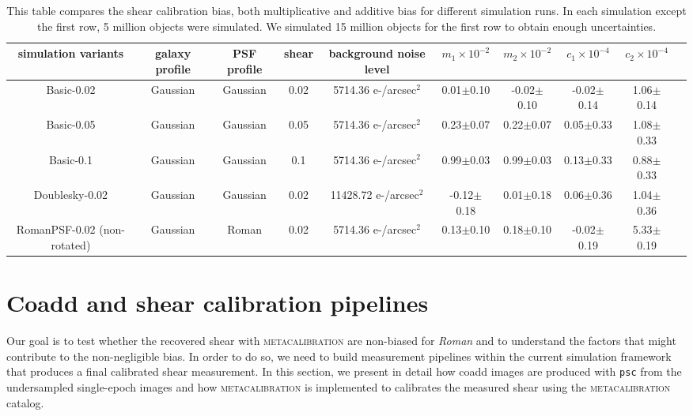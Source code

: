 \documentclass[fleqn,usenatbib]{mnras}
\begin{document}
\begin{table}
	\centering
	\begin{tabular}[width=\textwidth]{ c|c|c|c|c|c|c|c|c|c } 
		\hline
		simulation variants & galaxy profile & PSF profile & shear & background noise level & $m_{1}\times10^{-2}$ & $m_{2}\times10^{-2}$ & $c_{1}\times10^{-4}$ & $c_{2}\times10^{-4}$\\
		\hline
		Basic-0.02 & Gaussian & Gaussian & 0.02 & 5714.36 e-/arcsec$^2$ & 0.01$\pm$0.10 & -0.02$\pm$0.10 & -0.02$\pm$0.14 & 1.06$\pm$0.14\\
		Basic-0.05 & Gaussian & Gaussian & 0.05 & 5714.36 e-/arcsec$^2$ & 0.23$\pm$0.07 & 0.22$\pm$0.07 & 0.05$\pm$0.33 & 1.08$\pm$0.33\\
		Basic-0.1 & Gaussian & Gaussian & 0.1 & 5714.36 e-/arcsec$^2$ & 0.99$\pm$0.03 & 0.99$\pm$0.03 & 0.13$\pm$0.33 & 0.88$\pm$0.33\\
		\hline
		Doublesky-0.02 & Gaussian & Gaussian & 0.02 & 11428.72 e-/arcsec$^2$ & -0.12$\pm$0.18 & 0.01$\pm$0.18 & 0.06$\pm$0.36 & 1.04$\pm$0.36\\
		\hline
		RomanPSF-0.02 (non-rotated) & Gaussian & Roman & 0.02 & 5714.36 e-/arcsec$^2$ & 0.13$\pm$0.10 & 0.18$\pm$0.10 & -0.02$\pm$0.19 & 5.33$\pm$0.19\\
		\hline
	\end{tabular}
	\caption{This table compares the shear calibration bias, both multiplicative and additive bias for different simulation runs. In each simulation except the first row, 5 million objects were simulated. We simulated 15 million objects for the first row to obtain enough uncertainties.}
	\label{tab:simple_sim_result}
\end{table}



\section{Coadd and shear calibration pipelines}
\label{sec:methods}
Our goal is to test whether the recovered shear with \textsc{metacalibration} are non-biased for \emph{Roman} and to understand the factors that might contribute to the non-negligible bias. In order to do so, we need to build measurement pipelines within the current simulation framework that produces a final calibrated shear measurement. In this section, we present in detail how coadd images are produced with \texttt{psc} from the undersampled single-epoch images and how \textsc{metacalibration} is implemented to calibrates the measured shear using the \textsc{metacalibration} catalog. 
\end{document}
